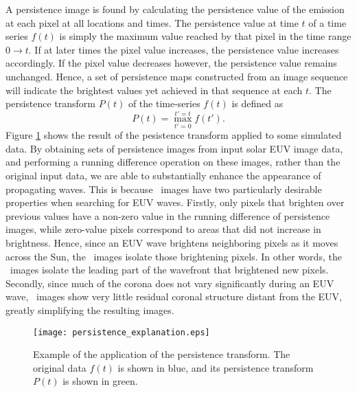 A persistence image is found by calculating the persistence value of
the emission at each pixel at all locations and times.  The
persistence value at time $t$ of a time series $f(t)$ is simply the
maximum value reached by that pixel in the time range $0\rightarrow
t$.  If at later times the pixel value increases, the persistence
value increases accordingly. If the pixel value decreases however, the
persistence value remains unchanged. Hence, a set of persistence maps
constructed from an image sequence will indicate the brightest values
yet achieved in that sequence at each $t$.  The persistence transform
$P(t)$ of the time-series $f(t)$ is defined as
\begin{equation}
\label{eqn:persisttransform}
P(t) = \max_{t'=0}^{t'=t}f(t').
\end{equation}
Figure \ref{fig:persistence} shows the result of the pesistence
transform applied to some simulated data.  By obtaining sets of
persistence images from input solar EUV image data, and performing a
running difference operation on these images, rather than the original
input data, we are able to substantially enhance the appearance of
propagating waves. This is because \RDP\ images have two particularly
desirable properties when searching for EUV waves.  Firstly, only
pixels that brighten over previous values have a non-zero value in the
running difference of persistence images, while zero-value pixels
correspond to areas that did not increase in brightness. Hence, since
an EUV wave brightens neighboring pixels as it moves across the Sun,
the \RDP\ images isolate those brightening pixels.  In other words,
the \RDP\ images isolate the leading part of the wavefront that
brightened new pixels.  Secondly, since much of the corona does not
vary significantly during an EUV wave, \RDP\ images show very little
residual coronal structure distant from the EUV, greatly simplifying
the resulting images.

\begin{figure}
\begin{center}
\texttt{[image: persistence\_explanation.eps]}
\caption{Example of the application of the persistence transform.  The
original data $f(t)$ is shown in blue, and its persistence transform
$P(t)$ is shown in green.}
\label{fig:persistence}
\end{center}
\end{figure}

